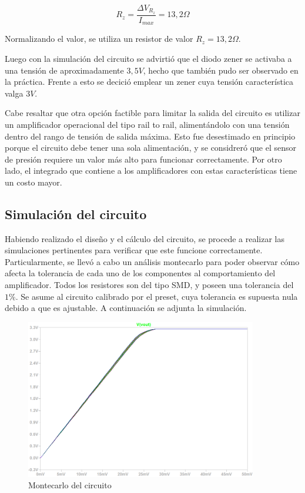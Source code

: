 \begin{equation}
R_z = \frac{\Delta V_{R_z}}{I_{max}} = 13,2 \Omega
\end{equation}

Normalizando el valor, se utiliza un resistor de valor $R_z = 13,2 \Omega$.

Luego con la simulaci\'on del circuito se advirti\'o que el diodo zener se activaba a una tensi\'on de aproximadamente $3,5V$, hecho que tambi\'en pudo ser observado en la pr\'actica. Frente a esto se decici\'o emplear un zener cuya tensi\'on caracter\'istica valga $3V$.

Cabe resaltar que otra opci\'on factible para limitar la salida del circuito es utilizar un amplificador operacional del tipo rail to rail, aliment\'andolo con una tensi\'on dentro del rango de tensi\'on de salida m\'axima. Esto fue desestimado en principio porque el circuito debe tener una sola alimentaci\'on, y se considrer\'o que el sensor de presi\'on requiere un valor m\'as alto para funcionar correctamente. Por otro lado, el integrado que contiene a los amplificadores con estas caracter\'isticas tiene un costo mayor.

\subsection{Simulaci\'on del circuito}

Habiendo realizado el dise\~no y el c\'alculo del circuito, se procede a realizar las simulaciones pertinentes para verificar que este funcione correctamente. Particularmente, se llev\'o a cabo un an\'alisis montecarlo para poder observar c\'omo afecta la tolerancia de cada uno de los componentes al comportamiento del amplificador. Todos los resistores son del tipo SMD, y poseen una tolerancia del $1\%$. Se asume al circuito calibrado por el preset, cuya tolerancia es supuesta nula debido a que es ajustable. A continuaci\'on se adjunta la simulaci\'on.

\begin{figure}[H]
    \centering
    \includegraphics[width=0.9\textwidth]{../EJ4/resources/montecarlo.png}
	\caption{Montecarlo del circuito}
   	\label{fig:EJ4_montecarlo}
\end{figure}


